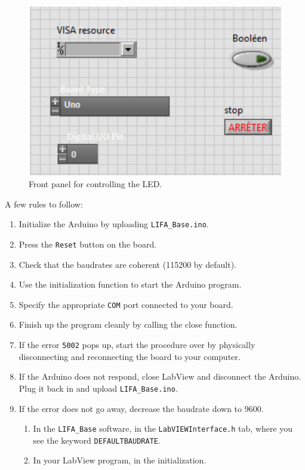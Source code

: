 \documentclass{labo}
\begin{document}
\begin{figure}[ht!]
  \centering
  \includegraphics[width=.6\textwidth]{front-panel-LED.png}
  \caption{Front panel for controlling the LED.}
  \label{fig:led-interface}
\end{figure}

\begin{leftbar}
A few rules to follow:
\begin{enumerate}
  \item Initialize the Arduino by uploading \texttt{LIFA\_Base.ino}.
  \item Press the \texttt{Reset} button on the board.
  \item Check that the baudrates are coherent (115200 by default).
  \item Use the initialization function to start the Arduino program.
  \item Specify the appropriate \texttt{COM} port connected to your board.
  \item Finish up the program cleanly by calling the close function.
  \item If the error \texttt{5002} pops up, start the procedure over by physically disconnecting and reconnecting the board to your computer.
  \item If the Arduino does not respond, close LabView and disconnect the Arduino. Plug it back in and upload \texttt{LIFA\_Base.ino}.
  \item If the error does not go away, decrease the baudrate down to 9600.
    \begin{enumerate}
      \item In the \texttt{LIFA\_Base} software, in the \texttt{LabVIEWInterface.h} tab, where you see the keyword \texttt{DEFAULTBAUDRATE}.
      \item In your LabView program, in the initialization.

    \end{enumerate}
\end{enumerate}
\end{leftbar}
\end{document}
